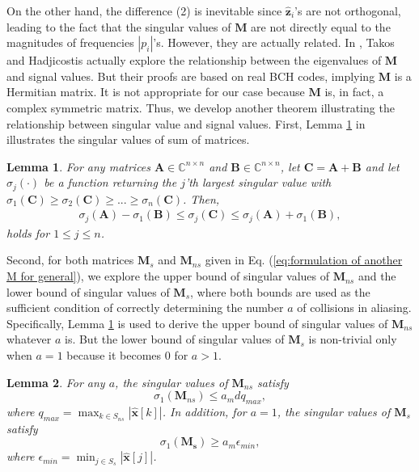 \documentclass[journal,onecolumn,11pt]{IEEEtran}
\newtheorem{lemma}{Lemma}
\begin{document}
On the other hand, the difference (2) is inevitable since $\hat{\bm{z}}_{i}$'s are not orthogonal, leading to the fact that the singular values of $\bm{M}$ are not directly equal to the magnitudes of frequencies $|p_{i}|$'s.
However, they are actually related.
In \cite{Takos2008}, Takos and Hadjicostis actually explore the relationship between the eigenvalues of $\bm{M}$ and signal values.
But their proofs are based on real BCH codes, implying $\bm{M}$ is a Hermitian matrix.
It is not appropriate for our case because $\bm{M}$ is, in fact, a complex symmetric matrix.
Thus, we develop another theorem illustrating the relationship between singular value and signal values.
First, Lemma \ref{lemma:singular value of sum of two matrices} in \cite{Hogben2007} illustrates the singular values of sum of matrices.
\begin{lemma}
\label{lemma:singular value of sum of two matrices}
For any matrices $\bm{A} \in \mathbb{C}^{n \times n}$ and $\bm{B}\in \mathbb{C}^{n \times n}$, let $\bm{C}=\bm{A}+\bm{B}$ and let $\sigma_{j}(\cdot)$ be a function returning the $j$'th largest singular value with $\sigma_{1}(\bm{C})\geq \sigma_{2}(\bm{C}) \geq ... \geq \sigma_{n}(\bm{C})$.
Then,
\begin{equation}
\begin{aligned}
\sigma_{j}(\bm{A})-\sigma_{1}(\bm{B}) \leq \sigma_{j}(\bm{C})
 \leq \sigma_{j}(\bm{A})+\sigma_{1}(\bm{B}),
\label{eq:singular value formula}
\end{aligned}
\end{equation}
holds for $1\leq j\leq n$.
\end{lemma}
Second, for both matrices $\bm{M}_s$ and $\bm{M}_{ns}$ given in Eq. (\ref{eq:formulation of another M for general}), we explore the upper bound of singular values of $\bm{M}_{ns}$ and the lower bound of singular values of $\bm{M}_{s}$, where both bounds are used as the sufficient condition of correctly determining the number $a$ of collisions in aliasing.
Specifically, Lemma \ref{lemma:singular value of sum of two matrices} is used to derive the upper bound of singular values of $\bm{M}_{ns}$ whatever $a$ is.
But the lower bound of singular values of $\bm{M}_{s}$ is non-trivial only when $a=1$ because it becomes 0 for $a>1$.
\begin{lemma}
\label{lemma:singular value and M}
For any $a$, the singular values of $\bm{M}_{ns}$ satisfy $$ \sigma_{1}(\bm{M}_{ns}) \leq a_{m}dq_{max},$$
where $q_{max} = \max_{k \in S_{ns}} |\bm{\hat{x}}[k]|$.
In addition, for $a=1$, the singular values of $\bm{M}_{s}$ satisfy
$$ \sigma_{1}(\bm{M_{s}}) \geq a_{m}\epsilon_{min},$$
where $\epsilon_{min} = \min_{j \in S_{s}} |\bm{\hat{x}}[j]|$.
\end{lemma}
\end{document}
